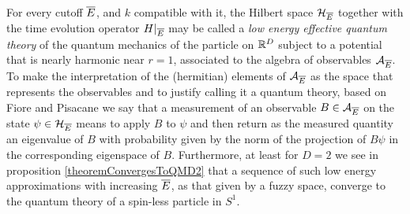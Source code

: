 For every cutoff $\overline{E}$, and $k$ compatible with it, the Hilbert space $\mathcal H_{\overline{E}}$ together with the time evolution operator $H|_{\overline{E}}$ may be called a \emph{low energy effective quantum theory} of the quantum mechanics of the particle on $\mathbb{R}^D$ subject to a potential that is nearly harmonic near $r = 1$, associated to the algebra of observables $\mathcal A_{\overline{E}}$. To make the interpretation of the (hermitian) elements of $\mathcal A_{\overline{E}}$ as the space that represents the observables and to justify calling it a quantum theory, based on Fiore and Pisacane \cite{Fiore2018} we  say that a measurement of an observable $B \in \mathcal A_{\overline{E}}$ on the state $\psi \in \mathcal H_{\overline{E}}$ means to apply $B$ to $\psi$ and then return as the measured quantity an eigenvalue of $B$ with probability given by the norm of the projection of $B \psi$ in the corresponding eigenspace of $B$. 
Furthermore, at least for $D = 2$ we see in proposition \ref{theoremConvergesToQMD2} that a sequence of such low energy approximations with increasing $\overline{E}$, as that given by a fuzzy space, converge to the quantum theory of a spin-less particle in $S^1$.

